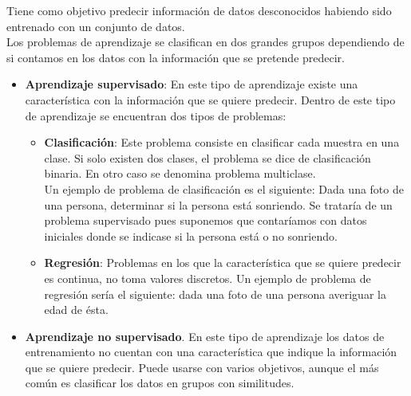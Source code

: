 Tiene como objetivo predecir información de datos desconocidos habiendo sido entrenado con un conjunto de datos.\cite{scikit-learn,shalev-shwartz_ben-david_2016,alpaydin_2010}\\



Los problemas de aprendizaje se clasifican en dos grandes grupos dependiendo de si contamos en los datos con la información que se pretende predecir.

\begin{itemize}
	\item \textbf{Aprendizaje supervisado}: En este tipo de aprendizaje existe una característica con la información que se quiere predecir.
	Dentro de este tipo de aprendizaje se encuentran dos tipos de problemas:
	
	\begin{itemize}
		\item \textbf{Clasificación}: Este problema consiste en clasificar cada muestra en una clase. Si solo existen dos clases, el problema se dice de clasificación binaria. En otro caso se denomina problema multiclase.\\
		
		Un ejemplo de problema de clasificación es el siguiente: Dada una foto de una persona, determinar si la persona está sonriendo. Se trataría de un problema supervisado pues suponemos que contaríamos con datos iniciales donde se indicase si la persona está o no sonriendo.
		\item \textbf{Regresión}: Problemas en los que la característica que se quiere predecir es continua, no toma valores discretos. Un ejemplo de problema de regresión sería el siguiente: dada una foto de una persona averiguar la edad de ésta.
	\end{itemize}
	
	\item \textbf{Aprendizaje no supervisado}. En este tipo de aprendizaje los datos de entrenamiento no cuentan con una característica que indique la información que se quiere predecir. Puede usarse con varios objetivos, aunque el más común es clasificar los datos en grupos con similitudes.
\end{itemize}
